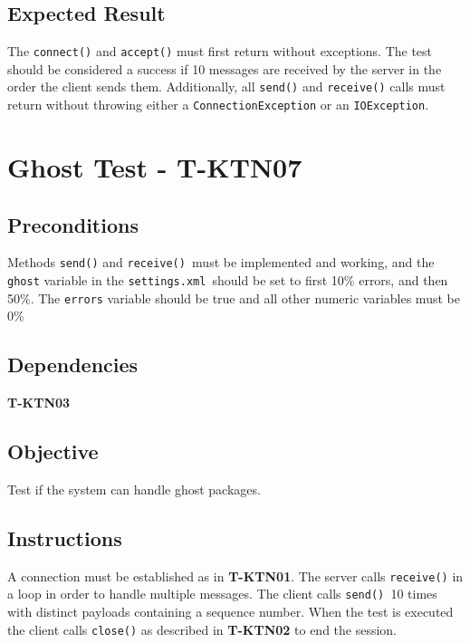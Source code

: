 \documentclass{article}
\begin{document}
\subsection{Expected Result}

The \texttt{connect()} and \texttt{accept()} must first return without
exceptions. The test should be considered a success if 10 messages are
received by the server in the order the client sends them. Additionally, all 
\texttt{send()} and \texttt{receive()} calls must return without throwing
either a \texttt{ConnectionException} or an \texttt{IOException}.

\section{Ghost Test - T-KTN07}

\subsection{Preconditions}

Methods \texttt{send()} and \texttt{receive() }must be implemented and
working, and the \texttt{ghost} variable in the \texttt{settings.xml }should
be set to first 10\% errors, and then 50\%. The \texttt{errors} variable
should be true and all other numeric variables must be 0\%

\subsection{Dependencies}

\textbf{T-KTN03}

\subsection{Objective}

Test if the system can handle ghost packages.

\subsection{Instructions}

A connection must be established as in \textbf{T-KTN01}. The server calls 
\texttt{receive()} in a loop in order to handle multiple messages. The
client calls \texttt{send() }10 times with distinct payloads containing a
sequence number. When the test is executed the client calls \texttt{close()}
as described in \textbf{T-KTN02} to end the session.
\end{document}
